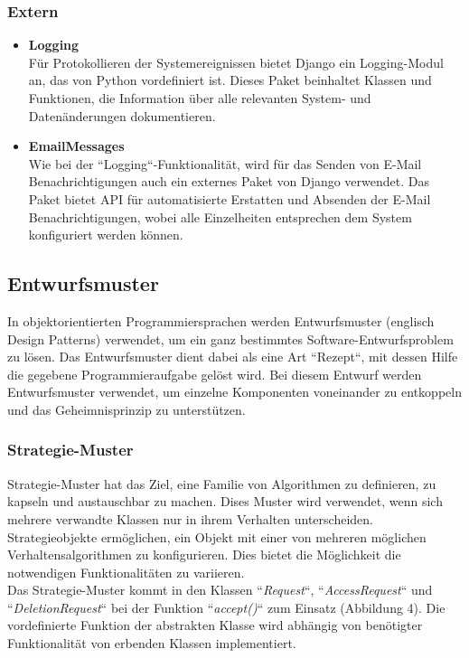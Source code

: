 \documentclass[parskip=full,11pt]{scrartcl}
\begin{document}
 \subsubsection*{Extern}
 \begin{itemize}
 \item{\textbf{Logging}}\\
Für Protokollieren der Systemereignissen bietet Django ein Logging-Modul an, das von Python vordefiniert ist. Dieses Paket beinhaltet Klassen und Funktionen, die Information über alle relevanten System- und Datenänderungen dokumentieren. 
 \item{\textbf{EmailMessages}}\\
Wie bei der ``Logging``-Funktionalität, wird für das Senden von E-Mail Benachrichtigungen auch ein externes Paket von Django verwendet. Das Paket bietet API für automatisierte Erstatten und Absenden der E-Mail Benachrichtigungen, wobei alle Einzelheiten entsprechen dem System konfiguriert werden können.
 \end{itemize}
 
\newpage
 \subsection{Entwurfsmuster}
In objektorientierten Programmiersprachen werden Entwurfsmuster (englisch Design Patterns) verwendet, um ein ganz bestimmtes Software-Entwurfsproblem zu lösen. Das Entwurfsmuster dient dabei als eine Art ``Rezept``, mit dessen Hilfe die gegebene Programmieraufgabe gelöst wird. 
Bei diesem Entwurf werden Entwurfsmuster verwendet, um einzelne Komponenten voneinander zu entkoppeln und das \gls{Geheimnisprinzip} zu unterstützen. 

 \subsubsection*{Strategie-Muster}
 
Strategie-Muster hat das Ziel, eine Familie von Algorithmen zu definieren, zu kapseln und austauschbar zu machen. Dises Muster wird verwendet, wenn sich mehrere verwandte Klassen nur in ihrem Verhalten unterscheiden. Strategieobjekte ermöglichen, ein Objekt mit einer von mehreren möglichen Verhaltensalgorithmen zu konfigurieren. Dies bietet die Möglichkeit die notwendigen Funktionalitäten zu variieren.\\
Das Strategie-Muster kommt in den Klassen ``\textit{Request}``, ``\textit{AccessRequest}`` und ``\textit{DeletionRequest}`` bei der Funktion ``\textit{accept()}`` zum Einsatz (Abbildung 4). Die vordefinierte Funktion der abstrakten Klasse wird abhängig von benötigter Funktionalität von erbenden Klassen  implementiert. \\\\ 
  
\end{document}

